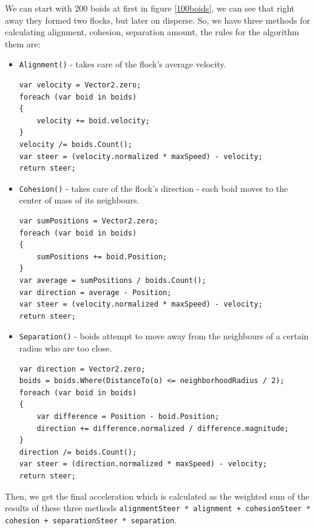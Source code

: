 \documentclass[a4paper, 12pt]{book}
\begin{document}
We can start with 200 boids at first in figure \ref{100boids}, we can see that right away they formed two flocks, but later on disperse. So, we have three methods for calculating alignment, cohesion, separation amount, the rules for the algorithm them are:
\begin{itemize}
    \item \texttt{Alignment()} - takes care of the flock's average velocity.

\lstset{style=sharpc}
\begin{lstlisting}
var velocity = Vector2.zero;
foreach (var boid in boids)
{
    velocity += boid.velocity;
}
velocity /= boids.Count();
var steer = (velocity.normalized * maxSpeed) - velocity;
return steer;
\end{lstlisting}

    \item \texttt{Cohesion()} - takes care of the flock's direction - each boid moves to the center of mass of its neighbours.

\begin{lstlisting}
var sumPositions = Vector2.zero;
foreach (var boid in boids)
{
    sumPositions += boid.Position;
}
var average = sumPositions / boids.Count();
var direction = average - Position;
var steer = (velocity.normalized * maxSpeed) - velocity;
return steer;
\end{lstlisting}

    \item \texttt{Separation()} - boids attempt to move away from the neighbours of a certain radius who are too close.

\begin{lstlisting}
var direction = Vector2.zero;
boids = boids.Where(DistanceTo(o) <= neighborhoodRadius / 2);
foreach (var boid in boids)
{
    var difference = Position - boid.Position;
    direction += difference.normalized / difference.magnitude;
}
direction /= boids.Count();
var steer = (direction.normalized * maxSpeed) - velocity;
return steer;
\end{lstlisting}

\end{itemize}

Then, we get the final acceleration which is calculated as the weighted sum of the results of these three methods \texttt{alignmentSteer * alignment + cohesionSteer * cohesion + separationSteer * separation}.
\end{document}
